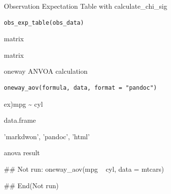 \documentclass[a4paper]{book}
\begin{document}
%
\begin{Description}
Observation Expectation Table with calculate\_chi\_sig
\end{Description}
%
\begin{Usage}
\begin{verbatim}
obs_exp_table(obs_data)
\end{verbatim}
\end{Usage}
%
\begin{Arguments}
\begin{ldescription}
\item[\code{obs\_data}] matrix
\end{ldescription}
\end{Arguments}
%
\begin{Value}
matrix
\end{Value}

%
\begin{Description}
oneway ANVOA calculation
\end{Description}
%
\begin{Usage}
\begin{verbatim}
oneway_aov(formula, data, format = "pandoc")
\end{verbatim}
\end{Usage}
%
\begin{Arguments}
\begin{ldescription}
\item[\code{formula}] ex)mpg \textasciitilde{} cyl

\item[\code{data}] data.frame

\item[\code{format}] 'markdwon', 'pandoc', 'html'
\end{ldescription}
\end{Arguments}
%
\begin{Value}
anova result
\end{Value}
%
\begin{Examples}
\begin{ExampleCode}
\#\# Not run: 
oneway_aov(mpg ~ cyl, data = mtcars)

## End(Not run)

\end{ExampleCode}
\end{Examples}
\end{document}

